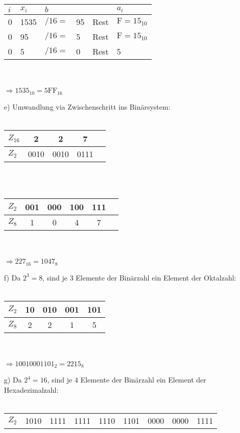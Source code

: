 \documentclass{article}
\begin{document}
\begin{itemize}
\begin{tabular}{llllll}
            $i$ & $x_i$ & $b$       &       &       & $a_i$ \\
            \hline 
            0   & 1535  & $/16 = $  & 95    & Rest  & $\mathrm{F} = 15_{10}$ \\
            0   & 95    & $/16 = $  & 5     & Rest  & $\mathrm{F} = 15_{10}$ \\
            0   & 5     & $/16 = $  & 0     & Rest  & 5
        \end{tabular}\\\\
        $\Rightarrow 1535_{10} = 5\mathrm{FF}_{16}$
        \item[e)] Umwandlung via Zwischenschritt ins Binärsystem:\\\\
        \begin{tabular}{l|cccc} 
            $Z_{16}$ & 2 & 2 & 7 \\
            \hline
            $Z_{2}$  & 0010 & 0010 & 0111
        \end{tabular} \\\\
        \begin{tabular}{l|ccccc} 
            $Z_{2}$ & 001 & 000 & 100 & 111 \\
            \hline
            $Z_{8}$ & 1   & 0   & 4   & 7
        \end{tabular} \\\\
        $\Rightarrow 227_{16} = 1047_8$
        \item[f)] Da $2^3 = 8$, sind je $3$ Elemente der Binärzahl ein Element der Oktalzahl:\\\\
        \begin{tabular}{l|cccc} 
            $Z_{2}$ & 10 & 010 & 001 & 101\\
            \hline
            $Z_{8}$ & 2  & 2   & 1   & 5
        \end{tabular} \\\\
        $\Rightarrow 10010001101_{2} = 2215_8$
        \item[g)] Da $2^4 = 16$, sind je $4$ Elemente der Binärzahl ein Element der Hexadezimalzahl:\\\\
        \begin{tabular}{l|cccccccc} 
            $Z_{2}$  & 1010 & 1111 & 1111 & 1110 & 1101 & 0000 & 0000 & 1111\\

\end{tabular}
\end{itemize}
\end{document}
